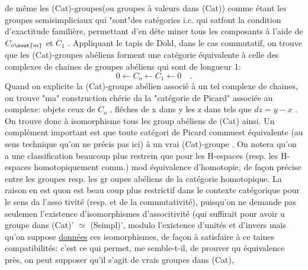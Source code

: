 
de même les (Cat)-groupes(ou groupes à valeurs dans (Cat)) comme étant
les groupes semisimpliciaux qui "sont"des catégories i.c. qui 
 satfont la condition d'exactitude familière, permettant d'en déte
miner tous les composants à l'aide de $C_{o\xout{m}}$ et $C_1$ . Appliquant le tapis de
Dold, dans le cas commutatif, on trouve que les (Cat)-groupes abéliens
forment une catégorie équivalente à celle des complexes de chaines de
groupes abéliens qui sont de longueur 1:
\[ 0 \leftarrow C_o \leftarrow C_1 \leftarrow 0 \quad . \]
Quand on explicite la (Cat)-groupe abélien associé à un tel complexe de
chaines, on trouve "ma" construction chérie da la "catégorie de Picard"
associée au complexe: objets ceux de $C_o$ , flêches de x dans y les z dans
tels que $dz = y-x$ . On trouve donc à isomorphisme  tous les group
abéliens de (Cat) ainsi. Un complément important est que toute catégori
de Picard  commuest équivalente (au sens technique qu'on ne précis
pas ici) à  un vrai (Cat)-groupe   . 
On notera qu'on a une  classification beaucoup plus restrein
que pour les H-espaces (resp. les H-espaces homotopiquement comm.) mod
équivalence d'homotopie, de façon précise entre les groupes resp. les gr
oupes abéliens de la catégorie homotopique. La raison en est quon est beau
coup plus restrictif dans le contexte catégorique pour le sens da l'asso
tivité (resp. et de la commutativité), puisqu'on ne demande pas seulemen
l'existence d'isomorphismes d'associtivité (qui suffirait pour avoir u
groupe dans  (Cat)' $\simeq$ (Ssimpl)', modulo l'existence d'unités et d'invers
mais qu'on suppose \uline{données} ces isomorphismes, de façon à satisfaire à ce
taines compatibilités: c'est ce qui permet, me semble-t-il, de prouver qu
\margin{(}équivalence près, on peut supposer qu'il s'agit de vrais groupes dans
(Cat), 

